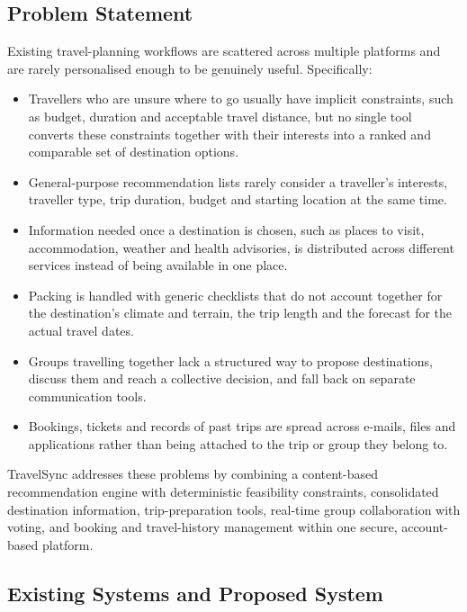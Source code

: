 \subsection{Problem Statement}

Existing travel-planning workflows are scattered across multiple platforms
and are rarely personalised enough to be genuinely useful. Specifically:

\begin{itemize}
  \item Travellers who are unsure where to go usually have implicit
    constraints, such as budget, duration and acceptable travel distance,
    but no single tool converts these constraints together with their
    interests into a ranked and comparable set of destination options.
  \item General-purpose recommendation lists rarely consider a traveller's
    interests, traveller type, trip duration, budget and starting location
    at the same time.
  \item Information needed once a destination is chosen, such as places to
    visit, accommodation, weather and health advisories, is distributed
    across different services instead of being available in one place.
  \item Packing is handled with generic checklists that do not account
    together for the destination's climate and terrain, the trip length and
    the forecast for the actual travel dates.
  \item Groups travelling together lack a structured way to propose
    destinations, discuss them and reach a collective decision, and fall
    back on separate communication tools.
  \item Bookings, tickets and records of past trips are spread across
    e-mails, files and applications rather than being attached to the trip
    or group they belong to.
\end{itemize}

TravelSync addresses these problems by combining a content-based
recommendation engine with deterministic feasibility constraints,
consolidated destination information, trip-preparation tools, real-time group
collaboration with voting, and booking and travel-history management within
one secure, account-based platform.

\subsection{Existing Systems and Proposed System}

